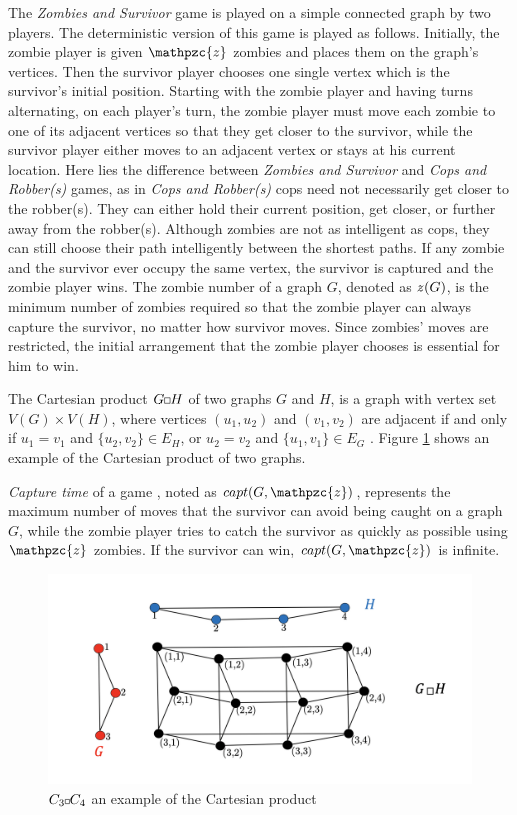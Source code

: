 \documentclass[1p]{elsarticle}
\newcommand{\zn}{\ooalign{$z$\cr\hfil\rule[.5ex]{.2em}{.08ex}\hfil\cr}}
\newcommand{\sq}[1][black]{%
\begin{tikzpicture}                                                           
  \draw[#1] (2pt,0pt) -- (6pt,0pt);   
  \draw[#1] (2pt,0pt) -- (2pt,4pt);    
  \draw[#1] (2pt,4pt) -- (6pt,4pt);   
  \draw[#1] (6pt,0pt) -- (6pt,4pt);
\end{tikzpicture}%
}
\newcommand{\sqSmall}[1][black]{%
\begin{tikzpicture}                                                           
  \draw[#1] (1.5pt,0pt) -- (4.5pt,0pt);   
  \draw[#1] (1.5pt,0pt) -- (1.5pt,3pt);    
  \draw[#1] (1.5pt,3pt) -- (4.5pt,3pt);   
  \draw[#1] (4.5pt,0pt) -- (4.5pt,3pt);
\end{tikzpicture}%
}
\begin{document}
The {\it Zombies and Survivor} game is played on a simple connected graph by two players. The deterministic version of
this game \cite{Fitz16} is played as follows. Initially, the zombie player is given $\mathpzc{z}$ zombies and places
them on the graph's vertices. Then the survivor player chooses one single vertex which is the survivor's initial
position. Starting with the zombie player and having turns alternating, on each player's turn, the zombie player must
move each zombie to one of its adjacent vertices so that they get closer to the survivor, while the survivor player
either moves to an adjacent vertex or stays at his current location. Here lies the difference between {\it Zombies and
Survivor} and {\it Cops and Robber(s)} games, as in {\it Cops and Robber(s)} cops need not necessarily get closer to the
robber(s). They can either hold their current position, get closer, or further away from the robber(s). Although zombies
are not as intelligent as cops, they can still choose their path intelligently between the shortest paths. If any zombie
and the survivor ever occupy the same vertex, the survivor is captured and the zombie player wins. The zombie number of
a graph $G$, denoted as $\zn(G)$, is the minimum number of zombies required so that the zombie player can always capture
the survivor, no matter how survivor moves. Since zombies' moves are restricted, the initial arrangement that the zombie
player chooses is essential for him to win.

The Cartesian product $G \sq H$ of two graphs $G$ and $H$, is a graph with vertex set $V(G) \times V(H)$, where
vertices $(u_1 , u_2)$ and $(v_1 , v_2)$ are adjacent if and only if $u_1 = v_1$ and $ \{ u_2 , v_2 \} \in E_{H} $, or
$u_2 = v_2$ and $ \{u_1 , v_1 \} \in E_{G}$ \cite{West02}. Figure \ref{fig:p2} shows an example of the Cartesian product
of two graphs.

{\it Capture time} of a game \cite{Bonato09}, noted as $capt(G,\mathpzc{z})$, represents the maximum number of moves
that the survivor can avoid being caught on a graph $G$, while the zombie player tries to catch the survivor as quickly
as possible using $\mathpzc{z}$ zombies. If the survivor can win, $capt(G,\mathpzc{z})$ is infinite.

\begin{figure}[h!]
	\centering
	\includegraphics[width=0.9\linewidth]{CpWest.png}
	\caption{$C_3 \sqSmall C_4$ an example of the Cartesian product}
	\label{fig:p2}
\end{figure}
\end{document}
